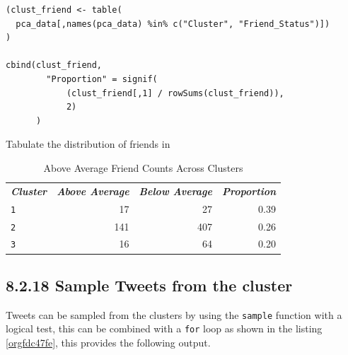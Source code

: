 \documentclass[11pt]{article}
\begin{document}
\begin{listing}[htbp]
\begin{verbatim}
(clust_friend <- table(
  pca_data[,names(pca_data) %in% c("Cluster", "Friend_Status")])
)

cbind(clust_friend,
        "Proportion" = signif(
            (clust_friend[,1] / rowSums(clust_friend)),
            2)
      )
\end{verbatim}
\caption{\label{org8e957ac}Tabulate the distribution of friends in}
\end{listing}

\begin{table}[htbp]
\caption{\label{tab:org8b3382a}Above Average Friend Counts Across Clusters}
\centering
\begin{tabular}{lrrr}
\textbf{\emph{Cluster}} & \textbf{\emph{Above Average}} & \textbf{\emph{Below Average}} & \textbf{\emph{Proportion}}\\
\texttt{1} & 17 & 27 & 0.39\\
\texttt{2} & 141 & 407 & 0.26\\
\texttt{3} & 16 & 64 & 0.20\\
\end{tabular}
\end{table}

\subsection{8.2.18 Sample Tweets from the cluster}
\label{sec:orga31c2be}
Tweets can be sampled from the clusters by using the \texttt{sample} function with a logical test, this can be combined with a \texttt{for} loop as shown in the listing \ref{orgfdc47fe}, this provides the following output.
\end{document}
